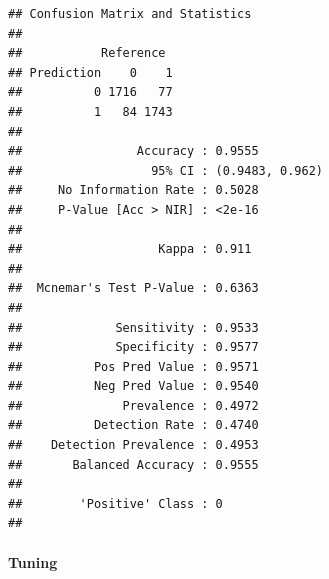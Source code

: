\documentclass[
]{article}
\newenvironment{Shaded}{\begin{snugshade}}{\end{snugshade}}
\newcommand{\AttributeTok}[1]{\textcolor[rgb]{0.77,0.63,0.00}{#1}}
\newcommand{\DecValTok}[1]{\textcolor[rgb]{0.00,0.00,0.81}{#1}}
\newcommand{\FloatTok}[1]{\textcolor[rgb]{0.00,0.00,0.81}{#1}}
\newcommand{\FunctionTok}[1]{\textcolor[rgb]{0.00,0.00,0.00}{#1}}
\newcommand{\NormalTok}[1]{#1}
\newcommand{\OtherTok}[1]{\textcolor[rgb]{0.56,0.35,0.01}{#1}}
\newcommand{\SpecialCharTok}[1]{\textcolor[rgb]{0.00,0.00,0.00}{#1}}
\newcommand{\StringTok}[1]{\textcolor[rgb]{0.31,0.60,0.02}{#1}}
\begin{document}
\begin{verbatim}
## Confusion Matrix and Statistics
## 
##           Reference
## Prediction    0    1
##          0 1716   77
##          1   84 1743
##                                          
##                Accuracy : 0.9555         
##                  95% CI : (0.9483, 0.962)
##     No Information Rate : 0.5028         
##     P-Value [Acc > NIR] : <2e-16         
##                                          
##                   Kappa : 0.911          
##                                          
##  Mcnemar's Test P-Value : 0.6363         
##                                          
##             Sensitivity : 0.9533         
##             Specificity : 0.9577         
##          Pos Pred Value : 0.9571         
##          Neg Pred Value : 0.9540         
##              Prevalence : 0.4972         
##          Detection Rate : 0.4740         
##    Detection Prevalence : 0.4953         
##       Balanced Accuracy : 0.9555         
##                                          
##        'Positive' Class : 0              
## 
\end{verbatim}

\hypertarget{tuning}{%
\paragraph{Tuning}\label{tuning}}

\begin{Shaded}
\end{Shaded}
\end{document}
